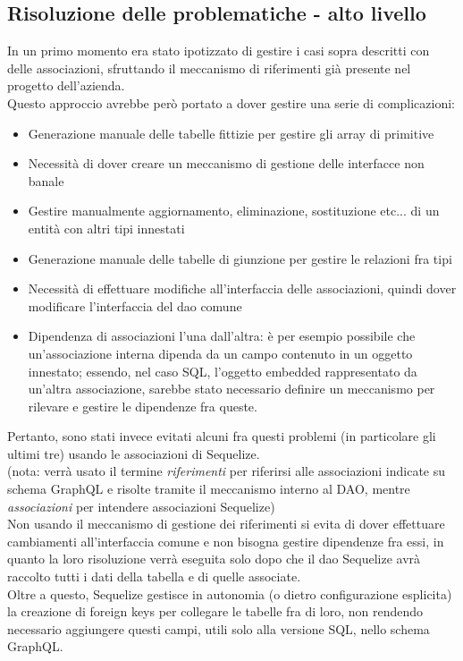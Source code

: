 \documentclass[a4paper, 12pt]{scrartcl}
\begin{document}
    \subsection*{Risoluzione delle problematiche - alto livello}
      In un primo momento era stato ipotizzato di gestire i casi sopra descritti con delle associazioni, sfruttando il meccanismo di riferimenti già presente nel progetto dell'azienda.\\
      Questo approccio avrebbe però portato a dover gestire una serie di complicazioni:
      \begin{itemize}
        \item Generazione manuale delle tabelle fittizie per gestire gli array di primitive
        \item Necessità di dover creare un meccanismo di gestione delle interfacce non banale
        \item Gestire manualmente aggiornamento, eliminazione, sostituzione etc... di un entità con altri tipi innestati
        \item Generazione manuale delle tabelle di giunzione per gestire le relazioni fra tipi
        \item Necessità di effettuare modifiche all'interfaccia delle associazioni, quindi dover modificare l'interfaccia del dao comune
        \item Dipendenza di associazioni l'una dall'altra: è per esempio possibile che un'associazione interna dipenda da un campo contenuto in un oggetto innestato; essendo, nel caso SQL, l'oggetto embedded rappresentato da un'altra associazione, sarebbe stato necessario definire un meccanismo per rilevare e gestire le dipendenze fra queste.
      \end{itemize}
      
      Pertanto, sono stati invece evitati alcuni fra questi problemi (in particolare gli ultimi tre) usando le associazioni di Sequelize.\\
      (nota: verrà usato il termine \emph{riferimenti} per riferirsi alle associazioni indicate su schema GraphQL e risolte tramite il meccanismo interno al DAO, mentre \emph{associazioni} per intendere associazioni Sequelize)\\
      Non usando il meccanismo di gestione dei riferimenti si evita di dover effettuare cambiamenti all'interfaccia comune e non bisogna gestire dipendenze fra essi, in quanto la loro risoluzione verrà eseguita solo dopo che il dao Sequelize avrà raccolto tutti i dati della tabella e di quelle associate.\\
      Oltre a questo, Sequelize gestisce in autonomia (o dietro configurazione esplicita) la creazione di foreign keys per collegare le tabelle fra di loro, non rendendo necessario aggiungere questi campi, utili solo alla versione SQL, nello schema GraphQL.\\
\end{document}
